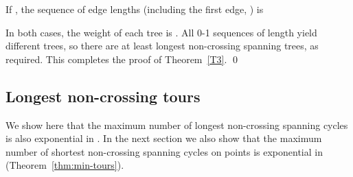 \documentclass[11pt]{article}
\begin{document}
If , the sequence of edge lengths (including the first edge,
) is

In both cases, the weight of each tree is .
All 0-1 sequences of length  yield different trees, so there are at
least  longest non-crossing spanning trees, as required.
This completes the proof of Theorem~\ref{T3}.
\qed

\subsection{Longest non-crossing tours}

We show here that the maximum number of longest non-crossing
spanning cycles is also exponential in .
In the next section we also show that the maximum number of shortest
non-crossing spanning cycles on  points is exponential in 
(Theorem~\ref{thm:min-tours}).
\end{document}
